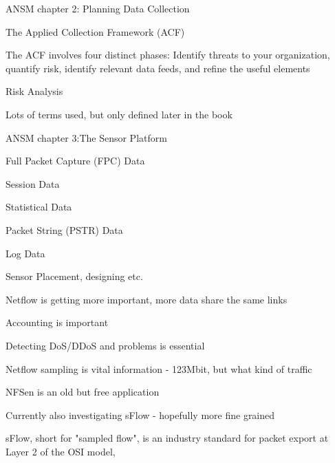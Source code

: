 \documentclass[Screen16to9,17pt]{foils}
\begin{document}


\begin{list1}
  \item ANSM chapter 2: Planning Data Collection
\begin{list2}
\item The Applied Collection Framework (ACF)
\item The ACF involves four distinct phases: Identify
threats to your organization, quantify risk, identify relevant data feeds, and refine the useful elements
\item Risk Analysis
\item Lots of terms used, but only defined later in the book
\end{list2}
\end{list1}


\begin{alltt}\footnotesize

\end{alltt}

\begin{list1}
\item ANSM chapter 3:The Sensor Platform
\begin{list2}
\item Full Packet Capture (FPC) Data
\item Session Data
\item Statistical Data
\item Packet String (PSTR) Data
\item Log Data
\item Sensor Placement, designing etc.
\end{list2}
\end{list1}


\begin{list2}
\item Netflow is getting more important, more data share the same links
\item Accounting is important
\item Detecting DoS/DDoS and problems is essential
\item Netflow sampling is vital information - 123Mbit, but what kind of traffic
\item NFSen is an old but free application
\item Currently also investigating sFlow - hopefully more fine grained
\item sFlow, short for "sampled flow", is an industry standard for packet export at Layer 2 of the OSI model, \\
\end{list2}
\end{document}

